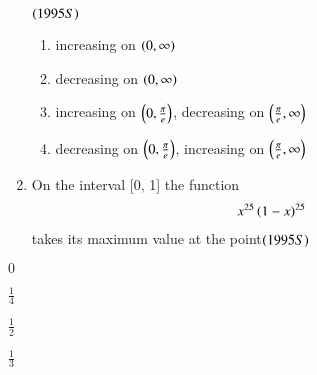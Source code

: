 \documentclass[journal,12pt,twocolumn]{IEEEtran}
\theoremstyle{remark}
\begin{document}
\begin{enumerate}
                               \hfill$\left(1995S\right)$\\

\begin{enumerate}
	\item increasing on $\left(0, \infty\right)$
	\item decreasing on $\left(0, \infty\right)$
	\item increasing on $\left(0, \frac{\pi}{e}\right)$,
		decreasing on $\left(\frac{\pi}{e}, \infty\right)$
	\item decreasing on $\left(0, \frac{\pi}{e}\right)$,
		increasing on $\left(\frac{\pi}{e}, \infty\right)$\\
\end{enumerate}

	\item On the interval [0, 1] the 
function\begin{align*}x^{25}\left(1-x\right)^{25}\end{align*} takes 
its maximum value at the point\hfill$\left(1995S\right)$
\end{enumerate}

\begin{enumerate}
\begin{multicols}{4}
	\item $0$ 
	\item $\frac{1}{4}$ 
	\item $\frac{1}{2}$ 
        \item $\frac{1}{3}$
\end{multicols}
\end{enumerate}

\newpage
\bigskip
\renewcommand{\thefigure}
{\theenumi}
\renewcommand{\thetable}
{\theenumi}
\end{document}
